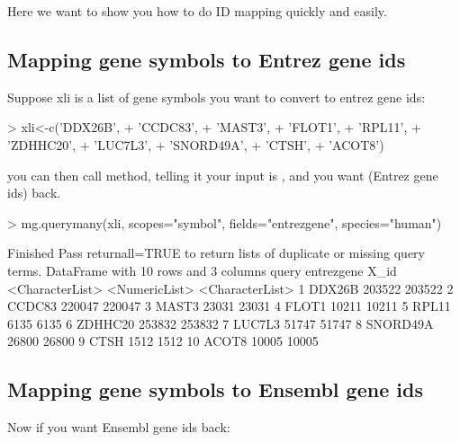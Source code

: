 \documentclass[12pt]{article}
\begin{document}
Here we want to show you how to do ID mapping quickly and easily. 

\subsection{Mapping gene symbols to Entrez gene ids}

Suppose xli is a list of gene symbols you want to convert to entrez gene ids:

\begin{Schunk}
\begin{Sinput}
> xli<-c('DDX26B',
+  'CCDC83',
+  'MAST3',
+  'FLOT1',
+  'RPL11',
+  'ZDHHC20',
+  'LUC7L3',
+  'SNORD49A',
+  'CTSH',
+  'ACOT8')
\end{Sinput}
\end{Schunk}

you can then call  method, telling it your input is , and you want  (Entrez gene ids) back.

\begin{Schunk}
\begin{Sinput}
> mg.querymany(xli, scopes="symbol", fields="entrezgene", species="human")
\end{Sinput}
\begin{Soutput}
Finished
Pass returnall=TRUE to return lists of duplicate or missing query terms.
DataFrame with 10 rows and 3 columns
             query    entrezgene            X_id
   <CharacterList> <NumericList> <CharacterList>
1           DDX26B        203522          203522
2           CCDC83        220047          220047
3            MAST3         23031           23031
4            FLOT1         10211           10211
5            RPL11          6135            6135
6          ZDHHC20        253832          253832
7           LUC7L3         51747           51747
8         SNORD49A         26800           26800
9             CTSH          1512            1512
10           ACOT8         10005           10005
\end{Soutput}
\end{Schunk}

\subsection{Mapping gene symbols to Ensembl gene ids}

Now if you want Ensembl gene ids back:
\end{document}
